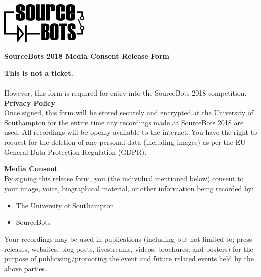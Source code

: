 \documentclass[a4paper]{article}
\begin{document}
\newcommand{\compyear}{2018\xspace}
\newcommand{\competition}{SourceBots \compyear}

\begin{minipage}[c]{0.30\textwidth}
\includegraphics[height=2cm]{fig-SourceBots}
\end{minipage}
\hspace{0.03\textwidth}
\begin{minipage}[c]{0.67\textwidth}
\begin{center}
{\large \textbf{\competition Media Consent Release Form} \par}
\end{center}
\end{minipage}
\vspace{1cm}

\textbf{This is not a ticket.}\\\\ However, this form is required for entry into the \competition competition.\\
\vspace{0.3cm}
\textbf{\large Privacy Policy}\\

Once signed, this form will be stored securely and encrypted at the University of Southampton for the entire time any recordings made at \competition are used. All recordings will be openly available to the internet. You have the right to request for the deletion of any personal data (including images) as per the EU General Data Protection Regulation (GDPR).

\vspace{0.5cm}
\textbf{\large Media Consent}\\

By signing this release form, you (the individual mentioned below) consent to your image, voice, biographical material, or other information being recorded by:
\begin{itemize}
    \item The University of Southampton
    \item SourceBots
\end{itemize}
Your recordings may be used in publications (including but not limited to; press releases, websites, blog posts, livestreams, videos, brochures, and posters) for the purpose of publicising/promoting the event and future related events held by the above parties.
\end{document}
